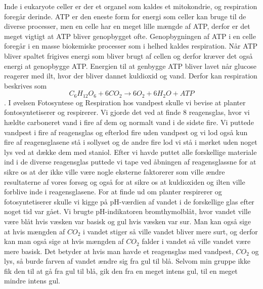 Inde i eukaryote celler er der et organel som kaldes et mitokondrie, og respiration foregår derinde. ATP er den eneste form for energi som celler kan bruge til de diverse processer, men en celle har en meget lille mængde af ATP, derfor er det meget vigtigt at ATP bliver genopbygget ofte. Genopbygningen af ATP i en celle foregår i en masse biokemiske processer som i helhed kaldes respiration. 
Når ATP bliver spaltet frigives energi som bliver brugt af cellen og derfor kræver det også energi at genopbygge ATP. Energien til at genbygge ATP bliver lavet når glucose reagerer med ilt, hvor der bliver dannet kuldioxid og vand. Derfor kan respiration beskrives som \begin{equation}C_6H_{12}O_6 + 6CO_2 \rightarrow 6O_2 + 6H_2O + ATP \end{equation}.
I øvelsen Fotosyntese og Respiration hos vandpest skulle vi bevise at planter fontosyntetiserer og respirerer. Vi gjorde det ved at finde  8 reagensglas, hvor vi hældte carboneret vand i fire af dem og normalt vand i de sidste fire. Vi puttede vandpest i fire af reagensglas og efterlod fire uden vandpest og vi lod også kun fire af reagensglasene stå i sollyset og de andre fire lod vi stå i mørket uden noget lys ved at dække dem med staniol. Efter vi havde puttet alle forskellige materiale ind i de diverse reagensglas puttede vi tape ved åbningen af reagensglassne for at sikre os at der ikke ville være nogle eksterne faktorerer som ville ændre resultaterne af vores forsøg og også for at sikre os at kuldioxiden og ilten ville forblive inde i reagensglasene. 
For at finde ud om planter respirerer og fotosyntetiserer skulle vi kigge på pH-værdien af vandet i de forskellige glas efter noget tid var gået. 
Vi brugte pH-indikatoren bromthymolblåt, hvor vandet ville være blåt hvis væsken var basisk og gul hvis væsken var sur. Man kan også sige at hvis mængden af \begin{math}CO_2\end{math} i vandet stiger så ville vandet bliver mere surt, og derfor kan man også sige at hvis mængden af \begin{math}CO_2\end{math} falder i vandet så ville vandet være mere basisk. Det betyder at hvis man havde et reagensglas med vandpest, \begin{math}CO_2\end{math} og lys, så burde farven af vandet ændre sig fra gul til blå. Selvom min gruppe ikke fik den til at gå fra gul til blå, gik den fra en meget intens gul, til en meget mindre intens gul. 

